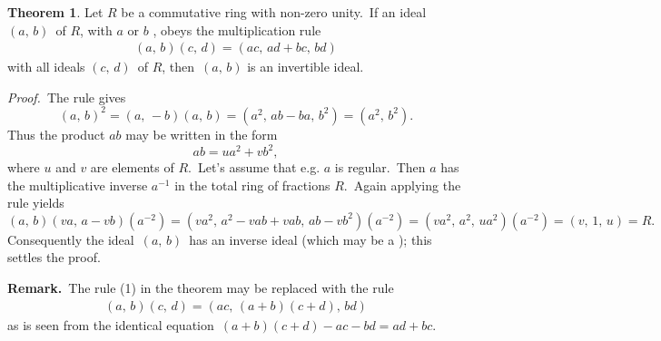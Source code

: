 \documentclass[12pt]{article}
\theoremstyle{definition}
\newtheorem*{thmplain}{Theorem}
\begin{document}
\begin{thmplain}
Let $R$ be a commutative ring with non-zero unity.\, If an ideal\, $(a,\,b)$\, of $R$, with $a$ or $b$ , obeys the multiplication rule
\begin{align}
      (a,\,b)(c,\,d) = (ac,\,ad\!+\!bc,\,bd)
\end{align}
with all ideals $(c,\,d)$\, of $R$, then\, $(a,\,b)$ is an invertible ideal.
\end{thmplain}

{\em Proof.}\, The rule gives
$$(a,\,b)^2 = (a,\,-b)(a,\,b) = (a^2,\,ab\!-\!ba,\,b^2) = (a^2,\,b^2).$$
Thus the product $ab$ may be written in the form
$$ab = ua^2\!+\!vb^2,$$
where $u$ and $v$ are elements of $R$.\, Let's assume that e.g. $a$ is regular.\, Then $a$ has the multiplicative inverse $a^{-1}$ in the total ring of fractions $R$.\, Again applying the rule yields
$$(a,\,b)(va,\,a-vb)(a^{-2}) = (va^2,\,a^2-vab+vab,\,ab-vb^2)(a^{-2}) =
 (va^2,\,a^2,\,ua^2)(a^{-2}) = (v,\,1,\,u) = R.$$
Consequently the ideal\, $(a,\,b)$\, has an inverse ideal (which may be a ); this settles the proof.

\textbf{Remark.}\, The rule (1) in the theorem may be replaced with the rule
\begin{align}
(a,\,b)(c,\,d) = (ac,\,(a\!+\!b)(c\!+\!d),\,bd)
\end{align}
as is seen from the identical equation\, $(a\!+\!b)(c\!+\!d)\!-\!ac\!-\!bd = ad+bc$.
\end{document}

